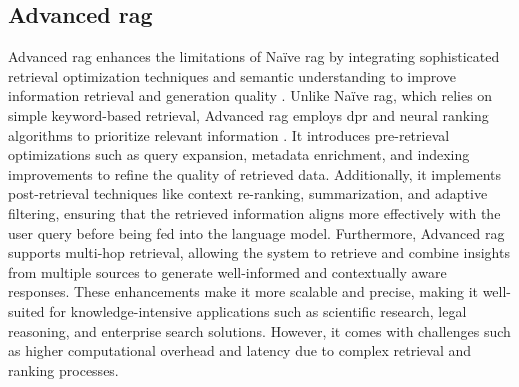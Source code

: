 \subsection*{Advanced \gls{rag}}\label{sec:advanced-rag}
Advanced \gls{rag} enhances the limitations of Na\"ive \gls{rag} by integrating sophisticated retrieval optimization techniques and semantic understanding to improve information retrieval and generation quality \cite{gao_retrieval-augmented_2024}.
Unlike Na\"ive \gls{rag}, which relies on simple keyword-based retrieval, Advanced \gls{rag} employs \gls{dpr} \cite{Karpukhin2020} and neural ranking algorithms to prioritize relevant information \cite{singh2025}.
It introduces pre-retrieval optimizations such as query expansion, metadata enrichment, and indexing improvements to refine the quality of retrieved data.
Additionally, it implements post-retrieval techniques like context re-ranking, summarization, and adaptive filtering, ensuring that the retrieved information aligns more effectively with the user query before being fed into the language model.
Furthermore, Advanced \gls{rag} supports multi-hop retrieval, allowing the system to retrieve and combine insights from multiple sources to generate well-informed and contextually aware responses.
These enhancements make it more scalable and precise, making it well-suited for knowledge-intensive applications such as scientific research, legal reasoning, and enterprise search solutions.
However, it comes with challenges such as higher computational overhead and latency due to complex retrieval and ranking processes.


